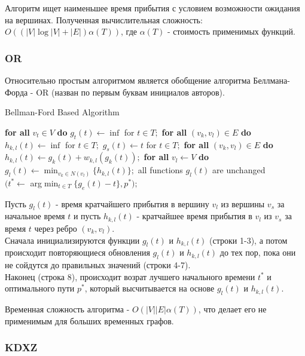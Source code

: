\documentclass[12pt]{article}
\begin{document}
Алгоритм ищет наименьшее время прибытия с условием возможности ожидания на вершинах. Полученная вычислительная сложность: $O((|V|\log|V|+|E|)\alpha(T))$, где $\alpha(T)$ - стоимость применимых функций. 

\subsubsection{OR}

Относительно простым алгоритмом является обобщение алгоритма Беллмана-Форда - OR \cite{or} (назван по первым буквам инициалов авторов).

\begin{algorithm}
\caption{Bellman-Ford Based Algorithm}
\begin{algorithmic}[1]
\State \textbf{for all} $v_t \in V$ \textbf{do} $g_t(t) \gets \inf$ for $t \in T;$
\State \textbf{for all} $(v_k,v_l) \in E$ \textbf{do} $h_{k,l}(t) \gets \inf$ for $t \in T;$
\State $g_s(t) \gets t$ for $t \in T;$
\Repeat
\State \textbf{for all} $(v_k,v_l) \in E$ \textbf{do} $h_{k,l}(t) \gets g_k(t) + w_{k,l}(g_k(t));$
\State \textbf{for all} $v_l \gets V$ \textbf{do} $g_l(t) \gets \min_{v_k \in N(v_l)}\{h_{k,l}(t)\};$
\Until all functions $g_l(t)$ are unchanged \\
\Return $(t^* \gets$ arg$\min_{t \in T} \{g_e(t) - t\},p^*);$
\end{algorithmic}
\end{algorithm}

Пусть $g_l(t)$ - время кратчайшего прибытия в вершину $v_l$ из вершины $v_s$ за начальное время $t$ и пусть
$h_{k,l}(t)$ - кратчайшее время прибытия в $v_l$ из $v_s$ за время $t$ через ребро $(v_k,v_l)$. \\
Сначала инициализируются функции $g_l(t)$ и $h_{k,l}(t)$  (строки 1-3), а потом происходит повторяющиеся обновления $g_l(t)$ и $h_{k,l}(t)$ до тех пор, пока они не сойдутся до правильных значений (строки 4-7). \\
Наконец (строка 8), происходит возрат лучшего начального времени $t^*$ и оптимального пути $p^*$, который высчитывается на основе $g_l(t)$ и $h_{k,l}(t)$. 

Временная сложность алгоритма - $O(|V||E|\alpha(T))$, что делает его не применимым для больших временных графов. 


\subsubsection{KDXZ}
\end{document}
